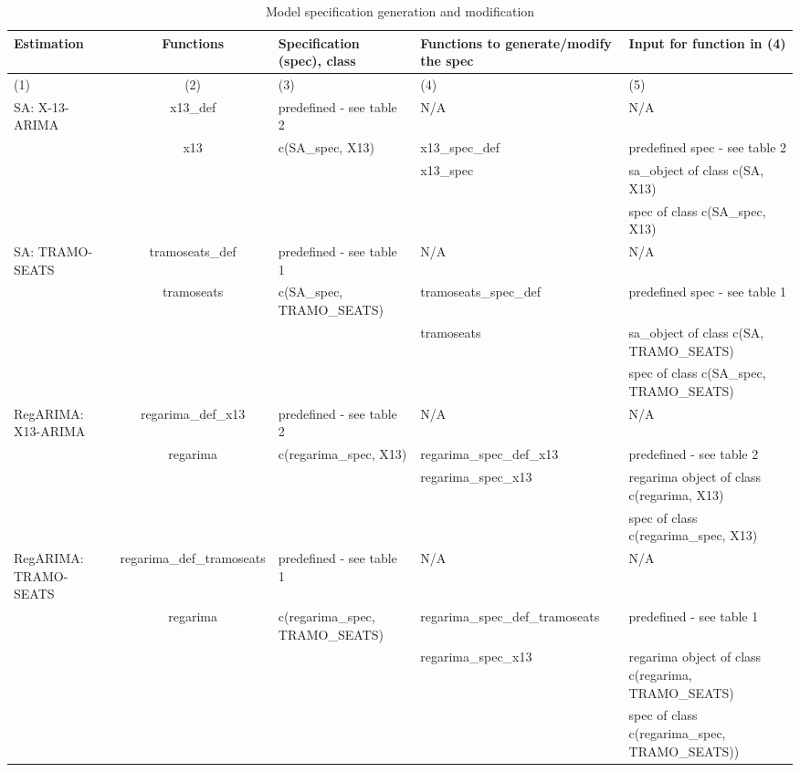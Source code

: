 \documentclass[article]{jss}
\begin{document}
\begin{table}
\caption{\label{tab:unnamed-chunk-13}\label{tab:t_spec_tab}Model specification generation and modification}
\centering
\fontsize{7}{9}\selectfont
\begin{tabular}[t]{>{\centering\arraybackslash}p{}c>{\centering\arraybackslash}p{}>{\centering\arraybackslash}p{}>{\centering\arraybackslash}p{3.5cm}}
\toprule
Estimation & Functions & Specification (spec), class & Functions to generate/modify the spec & Input for function in (4)\\
\midrule
(1) & (2) & (3) & (4) & (5)\\
SA: X-13-ARIMA & x13\_def & predefined - see table 2 & N/A & N/A\\
 & x13 & c(SA\_spec, X13) & x13\_spec\_def & predefined spec - see table 2\\
 &  &  & x13\_spec & sa\_object of class c(SA,  X13)\\
 &  &  &  & spec of class c(SA\_spec, X13)\\
\addlinespace
SA: TRAMO-SEATS & tramoseats\_def & predefined - see table 1 & N/A & N/A\\
 & tramoseats & c(SA\_spec, TRAMO\_SEATS) & tramoseats\_spec\_def & predefined spec - see table 1\\
 &  &  & tramoseats & sa\_object of class c(SA,  TRAMO\_SEATS)\\
 &  &  &  & spec of class c(SA\_spec, TRAMO\_SEATS)\\
RegARIMA: X13-ARIMA & regarima\_def\_x13 & predefined - see table 2 & N/A & N/A\\
\addlinespace
 & regarima & c(regarima\_spec, X13) & regarima\_spec\_def\_x13 & predefined - see table 2\\
 &  &  & regarima\_spec\_x13 & regarima object of class c(regarima, X13)\\
 &  &  &  & spec of class c(regarima\_spec, X13)\\
RegARIMA: TRAMO-SEATS & regarima\_def\_tramoseats & predefined - see table 1 & N/A & N/A\\
 & regarima & c(regarima\_spec, TRAMO\_SEATS) & regarima\_spec\_def\_tramoseats & predefined - see table 1\\
\addlinespace
 &  &  & regarima\_spec\_x13 & regarima object of class c(regarima, TRAMO\_SEATS)\\
 &  &  &  & spec of class c(regarima\_spec, TRAMO\_SEATS))\\
\bottomrule
\end{tabular}
\end{table}
\end{document}
